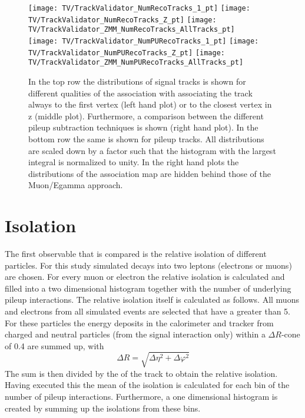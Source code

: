 \begin{figure}[h!b]
  \centering
  \texttt{[image: TV/TrackValidator\_NumRecoTracks\_1\_pt]}
  \texttt{[image: TV/TrackValidator\_NumRecoTracks\_Z\_pt]}
  \texttt{[image: TV/TrackValidator\_ZMM\_NumRecoTracks\_AllTracks\_pt]}
  \\
  \texttt{[image: TV/TrackValidator\_NumPURecoTracks\_1\_pt]}
  \texttt{[image: TV/TrackValidator\_NumPURecoTracks\_Z\_pt]}
  \texttt{[image: TV/TrackValidator\_ZMM\_NumPURecoTracks\_AllTracks\_pt]}
  \caption[Distributions of the transverse momentum of signal and pileup tracks for different qualities of the association and different pileup subtraction techniques ]{In the top row the \pt distributions of signal tracks is shown for different qualities of the association with associating the track always to the first vertex (left hand plot) or to the closest vertex in z (middle plot). Furthermore, a comparison between the different pileup subtraction techniques is shown (right hand plot). In the bottom row the same is shown for pileup tracks. All distributions are scaled down by a factor such that the histogram with the largest integral is normalized to unity. In the right hand plots the distributions of the association map are hidden behind those of the Muon/Egamma approach. \label{plot:OOTrackPt}}
\end{figure}

\section{Isolation \label{sec:OOIso}}

The first observable that is compared is the relative isolation of different particles. For this study simulated \Zz{} decays into two leptons (electrons or muons) are chosen. For every muon or electron the relative isolation is calculated and filled into a two dimensional histogram together with the number of underlying pileup interactions.  The relative isolation itself is calculated as follows. All muons and electrons from all simulated events are selected that have a \pt greater than 5\GeV. For these particles the energy deposits in the calorimeter and tracker from charged and neutral particles (from the signal interaction only) within a $\Delta{}R$-cone of 0.4 are summed up, with
\begin{equation}
\Delta{}R = \sqrt{\Delta{}\eta{}^{2} + \Delta{}\varphi{}^{2}}
\label{eq:OODeltaR}
\end{equation}
The sum is then divided by the \pt of the track to obtain the relative isolation. Having executed this the mean of the isolation is calculated for each bin of the number of pileup interactions. Furthermore, a one dimensional histogram is created by summing up the isolations from these bins.

